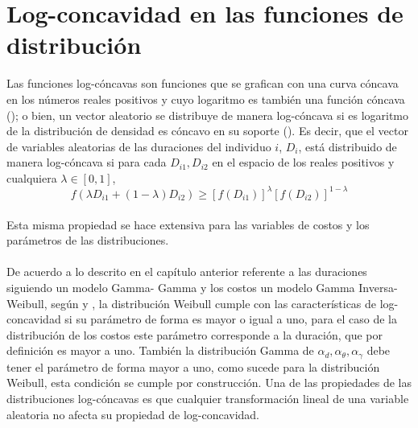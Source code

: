 \section{Log-concavidad en las funciones de distribuci\'on}
Las funciones log-c\'oncavas son funciones que se grafican con una curva c\'oncava en los n\'umeros reales positivos y cuyo logaritmo es tambi\'en una funci\'on c\'oncava (\cite{bagnoli2005log}); o bien, un vector aleatorio se distribuye de manera log-c\'oncava  si es logaritmo de la distribuci\'on de densidad es c\'oncavo en su soporte (\cite{an1996log}). Es decir, que el vector de variables aleatorias de las duraciones del individuo $i$, $D_i$, est\'a distribuido de manera log-c\'oncava si para cada $D_{i1}, D_{i2}$ en el espacio de los reales positivos y cualquiera $\lambda \in [0,1]$, \\
\[f(\lambda D_{i1}+(1-\lambda)D_{i2}) \geq [f(D_{i1})]^\lambda [f(D_{i2})]^{1-\lambda}\] 
\\
Esta misma propiedad se hace extensiva para las variables de costos y los par\'ametros de las distribuciones.\\
\\
De acuerdo a lo descrito en el cap\'itulo anterior referente a las duraciones siguiendo un modelo Gamma- Gamma y los costos un modelo Gamma Inversa-Weibull, seg\'un \cite{bagnoli2005log} y \cite{an1996log}, la distribuci\'on Weibull cumple con las caracter\'isticas de log-concavidad si su par\'ametro de forma es mayor o igual a uno, para el caso de la distribuci\'on de los costos este par\'ametro corresponde a la duraci\'on, que por definici\'on es mayor a uno. Tambi\'en la distribuci\'on Gamma de $\alpha_d,\alpha_\theta, \alpha_\gamma$ debe tener el par\'ametro de forma mayor a uno, como sucede para la distribuci\'on Weibull, esta condici\'on se cumple por construcci\'on. Una de las propiedades de las distribuciones log-c\'oncavas es que cualquier transformaci\'on lineal de una variable aleatoria no afecta su propiedad de log-concavidad. 
